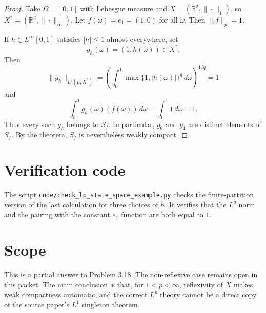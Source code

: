 \documentclass[11pt]{article}
\begin{document}
\begin{proof}
Take $\Omega=[0,1]$ with Lebesgue measure and
$X=(\mathbb R^2,\|\cdot\|_1)$, so $X^*=(\mathbb R^2,\|\cdot\|_\infty)$.
Let $f(\omega)=e_1=(1,0)$ for all $\omega$. Then $\|f\|_p=1$.

If $h\in L^\infty[0,1]$ satisfies $|h|\leq 1$ almost everywhere, set
\[
g_h(\omega)=(1,h(\omega))\in X^*.
\]
Then
\[
\|g_h\|_{L^q(\mu,X^*)}
=\left(\int_0^1 \max\{1,|h(\omega)|\}^q\,d\omega\right)^{1/q}=1
\]
and
\[
\int_0^1 g_h(\omega)(f(\omega))\,d\omega
=\int_0^1 1\,d\omega=1.
\]
Thus every such $g_h$ belongs to $S_f$. In particular, $g_0$ and $g_1$ are
distinct elements of $S_f$. By the theorem, $S_f$ is nevertheless weakly
compact.
\end{proof}

\section*{Verification code}

The script \texttt{code/check\_lp\_state\_space\_example.py} checks the
finite-partition version of the last calculation for three choices of $h$.
It verifies that the $L^q$ norm and the pairing with the constant $e_1$
function are both equal to $1$.

\section*{Scope}

This is a partial answer to Problem 3.18. The non-reflexive case remains open
in this packet. The main conclusion is that, for $1<p<\infty$, reflexivity of
$X$ makes weak compactness automatic, and the correct $L^p$ theory cannot be
a direct copy of the source paper's $L^1$ singleton theorem.
\end{document}
